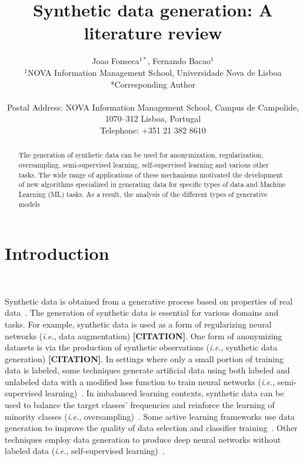 \documentclass[parskip=full]{scrartcl}
\title{Synthetic data generation: A literature review}
\author{%
	Joao Fonseca\(^{1*}\), Fernando Bacao\(^{1}\)
	\\
	\small{\(^{1}\)NOVA Information Management School, Universidade Nova de Lisboa}
	\\
	\small{*Corresponding Author}
	\\
	\\
	\small{Postal Address: NOVA Information Management School, Campus de
    Campolide, 1070--312 Lisboa, Portugal}
	\\
	\small{Telephone: +351 21 382 8610}
}
\date{}
\begin{document}
\maketitle
\linenumbers

\begin{abstract}

    The generation of synthetic data can be used for anonymization,
    regularization, oversampling, semi-supervised learning, self-supervised
    learning and various other tasks. The wide range of applications of these
    mechanisms motivated the development of new algorithms specialized in
    generating data for specific types of data and Machine Learning (ML)
    tasks. As a result, the analysis of the different types of generative
    models 



\end{abstract}

\section{Introduction}~\label{sec:introduction}

Synthetic data is obtained from a generative process based on properties of
real data~\cite{assefa2020generating}. The generation of synthetic data is
essential for various domains and tasks. For example, synthetic data is used
as a form of regularizing neural networks (\textit{i.e.}, data augmentation)
\textbf{[CITATION]}. One form of anonymizing datasets is via the production of
synthetic observations (\textit{i.e.}, synthetic data generation)
\textbf{[CITATION]}. In settings where only a small portion of training data
is labeled, some techniques generate artificial data using both labeled and
unlabeled data with a modified loss function to train neural networks
(\textit{i.e.}, semi-supervised learning)~\cite{laine2017temporal}. In
imbalanced learning contexts, synthetic data can be used to balance the target
classes' frequencies and reinforce the learning of minority classes
(\textit{i.e.}, oversampling)~\cite{fonseca2021improving}. Some active
learning frameworks use data generation to improve the quality of data
selection and classifier training~\cite{kim2021lada}. Other techniques employ
data generation to produce deep neural networks without labeled data
(\textit{i.e.}, self-supervised learning)~\cite{grill2020bootstrap}.
\end{document}
